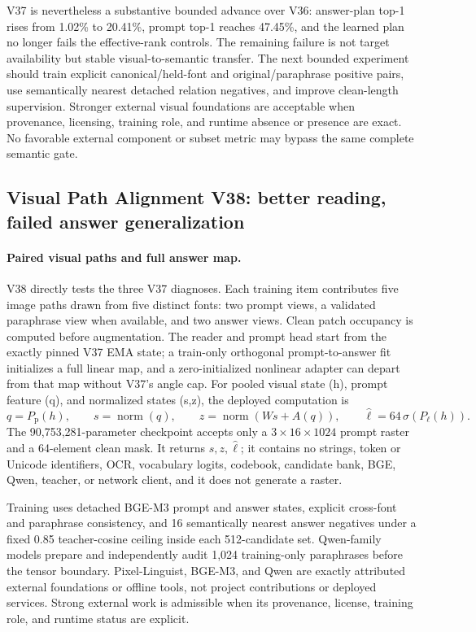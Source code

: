 \documentclass[11pt]{article}
\begin{document}
V37 is nevertheless a substantive bounded advance over V36: answer-plan top-1
rises from 1.02\% to 20.41\%, prompt top-1 reaches 47.45\%, and the learned
plan no longer fails the effective-rank controls. The remaining failure is not
target availability but stable visual-to-semantic transfer. The next bounded
experiment should train explicit canonical/held-font and
original/paraphrase positive pairs, use semantically nearest detached
relation negatives, and improve clean-length supervision. Stronger external
visual foundations are acceptable when provenance, licensing, training role,
and runtime absence or presence are exact. No favorable external component or
subset metric may bypass the same complete semantic gate.

\subsection{Visual Path Alignment V38: better reading, failed answer generalization}

\paragraph{Paired visual paths and full answer map.}
V38 directly tests the three V37 diagnoses. Each training item contributes
five image paths drawn from five distinct fonts: two prompt views, a validated
paraphrase view when available, and two answer views. Clean patch occupancy is
computed before augmentation. The reader and prompt head start from the
exactly pinned V37 EMA state; a train-only orthogonal prompt-to-answer fit
initializes a full linear map, and a zero-initialized nonlinear adapter can
depart from that map without V37's angle cap. For pooled visual state (h),
prompt feature (q), and normalized states (s,z), the deployed computation is
\[
q=P_{\mathrm p}(h),\qquad
s=\operatorname{norm}(q),\qquad
z=\operatorname{norm}(Ws+A(q)),\qquad
\hat\ell=64\,\sigma(P_\ell(h)).
\]
The 90,753,281-parameter checkpoint accepts only a
$3\times16\times1024$ prompt raster and a 64-element clean mask. It returns
$s,z,\hat\ell$; it contains no strings, token or Unicode identifiers, OCR,
vocabulary logits, codebook, candidate bank, BGE, Qwen, teacher, or network
client, and it does not generate a raster.

Training uses detached BGE-M3 prompt and answer states, explicit cross-font and
paraphrase consistency, and 16 semantically nearest answer negatives under a
fixed 0.85 teacher-cosine ceiling inside each 512-candidate set. Qwen-family
models prepare and independently audit 1,024 training-only paraphrases before
the tensor boundary. Pixel-Linguist, BGE-M3, and Qwen are exactly attributed
external foundations or offline tools, not project contributions or deployed
services. Strong external work is admissible when its provenance, license,
training role, and runtime status are explicit.
\end{document}

